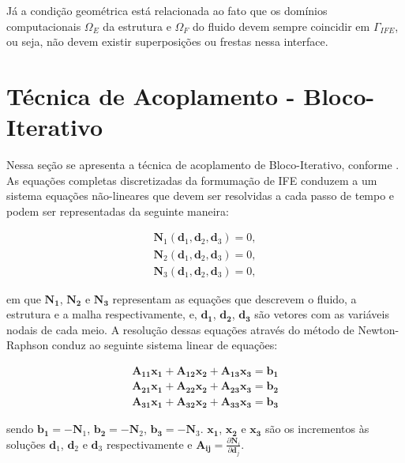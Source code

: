 \documentclass[tese_patricia]{subfiles}
\begin{document}
Já a condição geométrica está relacionada ao fato que os domínios computacionais $\Omega_E$ da estrutura e $\Omega_F$ do fluido devem sempre coincidir em $\Gamma_{IFE}$, ou seja, não devem existir superposições ou frestas nessa interface.


\section{Técnica de Acoplamento - Bloco-Iterativo}

Nessa seção se apresenta a técnica de acoplamento de Bloco-Iterativo, conforme . As equações completas discretizadas da formumação de IFE conduzem a um sistema equações não-lineares que devem ser resolvidas a cada passo de tempo e podem ser representadas da seguinte maneira:

\begin{align}
	\mathbf{N}_{1}\left(\mathbf{d}_{1},\mathbf{d}_{2},\mathbf{d}_{3}\right) = 0,\\
	\mathbf{N}_{2}\left(\mathbf{d}_{1},\mathbf{d}_{2},\mathbf{d}_{3}\right) = 0,\\
	\mathbf{N}_{3}\left(\mathbf{d}_{1},\mathbf{d}_{2},\mathbf{d}_{3}\right) = 0,
\end{align}

\noindent em que $\mathbf{{N}_{1}}$, $\mathbf{{N}_{2}}$ e $\mathbf{{N}_{3}}$ representam as equações que descrevem o fluido, a estrutura e a malha respectivamente, e, $\mathbf{{d}_{1}}$, $\mathbf{{d}_{2}}$, $\mathbf{{d}_{3}}$ são vetores com as variáveis nodais de cada meio. 
A resolução dessas equações através do método de Newton-Raphson conduz ao seguinte sistema linear de equações:

\begin{align}
\mathbf{A_{11}}\mathbf{x_{1}} + \mathbf{A_{12}}\mathbf{x_{2}} + \mathbf{A_{13}}\mathbf{x_{3}} = \mathbf{b_{1}}\\
\mathbf{A_{21}}\mathbf{x_{1}} + \mathbf{A_{22}}\mathbf{x_{2}} + \mathbf{A_{23}}\mathbf{x_{3}} = \mathbf{b_{2}}\\
\mathbf{A_{31}}\mathbf{x_{1}} + \mathbf{A_{32}}\mathbf{x_{2}} + \mathbf{A_{33}}\mathbf{x_{3}} = \mathbf{b_{3}}
\end{align}

\noindent sendo $\mathbf{b_{1}} = - \mathbf{N}_{1}$, $\mathbf{b_{2}} = - \mathbf{N}_{2}$, $\mathbf{b_{3}} = - \mathbf{N}_{3}$. $\mathbf{x_{1}}$, $\mathbf{x_{2}}$ e $\mathbf{x_{3}}$ são os incrementos às soluções $\mathbf{d}_{1}$, $\mathbf{d}_{2}$ e $\mathbf{d}_{3}$ respectivamente e $\mathbf{A_{ij}} = \frac{\partial\mathbf{N}_{i}}{\partial\mathbf{d}_{j}}$. 
\end{document}
